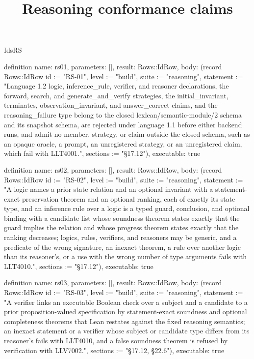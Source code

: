 \begin{lexlean}{IdsRS}
\title{Reasoning conformance claims}
\begin{semanticmodule}
definition{
  name: rs01,
  parameters: [],
  result: Rows::IdRow,
  body: (record Rows::IdRow {id := "RS-01", level := "build", suite := "reasoning", statement := "Language 1.2 logic, inference_rule, verifier, and reasoner declarations, the forward, search, and generate_and_verify strategies, the initial_invariant, terminates, observation_invariant, and answer_correct claims, and the reasoning_failure type belong to the closed lexlean/semantic-module/2 schema and its snapshot schema, are rejected under language 1.1 before either backend runs, and admit no member, strategy, or claim outside the closed schema, such as an opaque oracle, a prompt, an unregistered strategy, or an unregistered claim, which fail with LLT4001.", sections := "§17.12"}),
  executable: true
}

definition{
  name: rs02,
  parameters: [],
  result: Rows::IdRow,
  body: (record Rows::IdRow {id := "RS-02", level := "build", suite := "reasoning", statement := "A logic names a prior state relation and an optional invariant with a statement-exact preservation theorem and an optional ranking, each of exactly its state type, and an inference rule over a logic is a typed guard, conclusion, and optional binding with a candidate list whose soundness theorem states exactly that the guard implies the relation and whose progress theorem states exactly that the ranking decreases; logics, rules, verifiers, and reasoners may be generic, and a predicate of the wrong signature, an inexact theorem, a rule over another logic than its reasoner's, or a use with the wrong number of type arguments fails with LLT4010.", sections := "§17.12"}),
  executable: true
}

definition{
  name: rs03,
  parameters: [],
  result: Rows::IdRow,
  body: (record Rows::IdRow {id := "RS-03", level := "build", suite := "reasoning", statement := "A verifier links an executable Boolean check over a subject and a candidate to a prior proposition-valued specification by statement-exact soundness and optional completeness theorems that Lean restates against the fixed reasoning semantics; an inexact statement or a verifier whose subject or candidate type differs from its reasoner's fails with LLT4010, and a false soundness theorem is refused by verification with LLV7002.", sections := "§17.12, §22.6"}),
  executable: true
}


\end{semanticmodule}
\end{lexlean}

